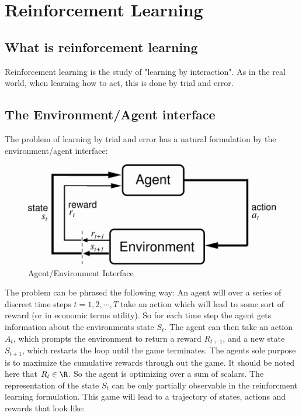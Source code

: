 \section{Reinforcement Learning}
\label{sec:rl_theory}

\subsection{What is reinforcement learning}

Reinforcement learning is the study of "learning by interaction". As in the real world, when learning how to act, this is done by trial and error.

\subsection{The Environment/Agent interface}

The problem of learning by trial and error has a natural formulation by the environment/agent interface:

\begin{figure}
    \centering
    \includegraphics[scale=0.5]{figures/agent_environment_interface.png}
    \caption{Agent/Environment Interface}
    \label{fig:agent_enviroment_interface}
\end{figure}

The problem can be phrased the following way: An agent will over a series of discreet time steps $t=1, 2, \cdots, T$ take an action which will lead to some sort of reward (or in economic terms utility). So for each time step the agent gets information about the environments state $S_t$. The agent can then take an action $A_t$, which prompts the environment to return a reward $R_{t+1}$, and a new state $S_{t+1}$, which restarts the loop until the game terminates. The agents sole purpose is to maximize the cumulative rewards through out the game. It should be noted here that $R_t \in \R$. So the agent is optimizing over a sum of scalars. The representation of the state $S_t$ can be only partially observable in the reinforcment learning formulation. This game will lead to a trajectory of states, actions and rewards that look like:

